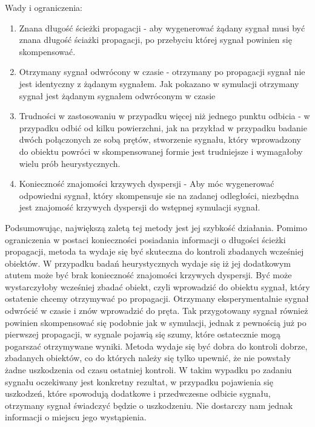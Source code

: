 Wady i ograniczenia:
\begin{enumerate}
\item Znana długość ścieżki propagacji - aby wygenerować żądany sygnał musi być znana długość ściażki propagacji, po przebyciu której sygnał powinien się skompensować.
\item Otrzymany sygnał odwrócony w czasie - otrzymany po propagacji sygnał nie jest identyczny z żądanym sygnałem. Jak pokazano w symulacji otrzymany sygnał jest żądanym sygnałem odwróconym w czasie
\item Trudności w zastosowaniu w przypadku więcej niż jednego punktu odbicia - w przypadku odbić od kilku powierzchni, jak na przykład w przypadku badanie dwóch połączonych ze sobą prętów, stworzenie sygnału, który wprowadzony do obiektu powróci w skompensowanej formie jest trudniejsze i wymagałoby wielu prób heurystycznych.
\item Konieczność znajomości krzywych dyspersji - Aby móc wygenerować odpowiedni sygnał, który skompensuje sie na zadanej odległości, niezbędna jest znajomość krzywych dyspersji do wstępnej symulacji sygnał.
\end{enumerate}
Podsumowując, największą zaletą tej metody jest jej szybkość działania. Pomimo ograniczenia w postaci konieczności posiadania informacji o długości ścieżki propagacji, metoda ta wydaje się być skuteczna do kontroli zbadanych wcześniej obiektów. W przypadku badań heurystycznych wydaje się iż jej dodatkowym atutem może być brak konieczność znajomości krzywych dyspersji. Być może wystarczyłoby wcześniej zbadać obiekt, czyli wprowadzić do obiektu sygnał, który ostatenie chcemy otrzymywać po propagacji. Otrzymany eksperymentalnie sygnał odwrócić w czasie i znów wprowadzić do pręta. Tak przygotowany sygnał również powinien skompensować się podobnie jak w symulacji, jednak z pewnością już po pierwszej propagacji, w sygnale pojawią się szumy, które ostatecznie mogą pogarszać otrzymywane wyniki. Metoda wydaje się być dobra do kontroli dobrze, zbadanych obiektów, co do których należy się tylko upewnić, że nie powstały żadne uszkodzenia od czasu ostatniej kontroli. W takim wypadku po zadaniu sygnału oczekiwany jest konkretny rezultat, w przypadku pojawienia się uszkodzeń, które spowodują dodatkowe i przedwczesne odbicie sygnału, otrzymany sygnał świadczyć będzie o uszkodzeniu. Nie dostarczy nam jednak informacji o miejscu jego wystąpienia.


